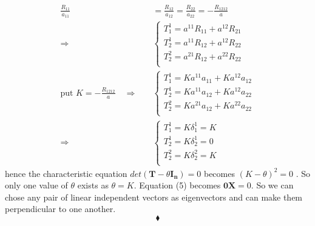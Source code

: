 \begin{align}
\frac{R_{11}}{a_{11}} &= \frac{R_{12}}{a_{12}}=\frac{R_{22}}{a_{22}}=-\frac{R_{1212}}{a}\\
\Rightarrow\quad & \left \{ \begin{array}{l}
 T^{1}_{1} = a^{11}R_{11} +  a^{12}R_{21}\\
 T^{1}_{2} = a^{11}R_{12} +  a^{12}R_{22}\\
 T^{2}_{2} = a^{21}R_{12} +  a^{22}R_{22}\\
\end{array} \right.\\
\text{put } K=-\frac{R_{1212}}{a} \quad \Rightarrow\quad & \left \{ \begin{array}{l}
 T^{1}_{1} = K a^{11}a_{11} +  K a^{12}a_{12}\\
 T^{1}_{2} = Ka^{11}a_{12} +  Ka^{12}a_{22}\\
 T^{2}_{2} = Ka^{21}a_{12} +  Ka^{22}a_{22}\\
\end{array} \right.\\
\Rightarrow\quad & \left \{ \begin{array}{l}
 T^{1}_{1} = K\delta^1_1 = K \\
 T^{1}_{2} = K\delta^1_2 = 0\\
 T^{2}_{2} = K\delta^2_2 = K\\
\end{array} \right.
\end{align}
hence the characteristic equation $det\left(\mathbf{T}-\theta \mathbf{I_n} \right)=0$ becomes $ (K-\theta)^2=0$ . So only one value of $\theta$ exists as $\theta = K$.  Equation (5) becomes $\mathbf{0}\mathbf{X}=0$. So we can chose any pair of linear independent vectors as eigenvectors and can make them perpendicular to one another.
$$\blacklozenge$$
\newpage

